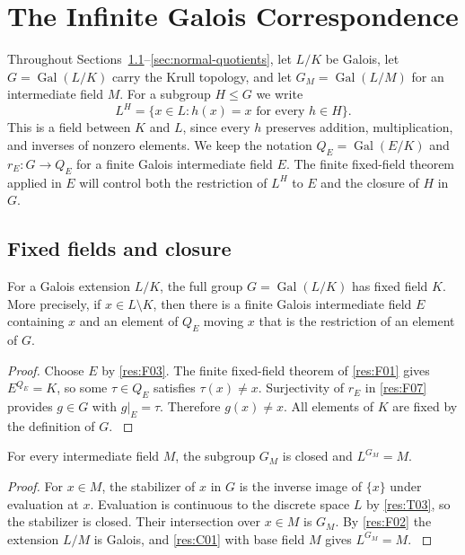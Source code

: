 \chapter{The Infinite Galois Correspondence}
\label{ch:galois-correspondence}

Throughout Sections~\ref{sec:fixed-fields}--\ref{sec:normal-quotients},
let \(L/K\) be Galois, let \(G=\operatorname{Gal}(L/K)\) carry the Krull
topology, and let \(G_M=\operatorname{Gal}(L/M)\) for an intermediate
field \(M\). For a subgroup \(H\leq G\) we write
\[
  L^H=\{x\in L : h(x)=x\text{ for every }h\in H\}.
\]
This is a field between \(K\) and \(L\), since every \(h\) preserves
addition, multiplication, and inverses of nonzero elements. We keep
the notation \(Q_E=\operatorname{Gal}(E/K)\) and
\(r_E:G\to Q_E\) for a finite Galois intermediate field \(E\).
The finite fixed-field theorem applied in \(E\) will control both
the restriction of \(L^H\) to \(E\) and the closure of \(H\) in \(G\).

\section{Fixed fields and closure}
\label{sec:fixed-fields}

\begin{proposition}
\label{res:C01}
For a Galois extension \(L/K\), the full group
\(G=\operatorname{Gal}(L/K)\) has fixed field \(K\). More precisely,
if \(x\in L\setminus K\), then there is a finite Galois intermediate
field \(E\) containing \(x\) and an element of \(Q_E\) moving \(x\)
that is the restriction of an element of \(G\).
\end{proposition}

\begin{proof}
Choose \(E\) by \ref{res:F03}. The finite fixed-field theorem
of \ref{res:F01} gives \(E^{Q_E}=K\), so some \(\tau\in Q_E\)
satisfies \(\tau(x)\ne x\). Surjectivity of \(r_E\) in \ref{res:F07}
provides \(g\in G\) with \(g|_E=\tau\). Therefore \(g(x)\ne x\).
All elements of \(K\) are fixed by the definition of \(G\).
\cite[Proposition 7.9]{milne}
\end{proof}

\begin{proposition}
\label{res:C02}
For every intermediate field \(M\), the subgroup \(G_M\) is closed
and \(L^{G_M}=M\).
\end{proposition}

\begin{proof}
For \(x\in M\), the stabilizer of \(x\) in \(G\) is the inverse
image of \(\{x\}\) under evaluation at \(x\). Evaluation is continuous
to the discrete space \(L\) by \ref{res:T03}, so the stabilizer is
closed. Their intersection over \(x\in M\) is \(G_M\). By \ref{res:F02}
the extension \(L/M\) is Galois, and \ref{res:C01} with base field \(M\)
gives \(L^{G_M}=M\).
\cite[Proposition 7.12(a)]{milne}
\end{proof}

